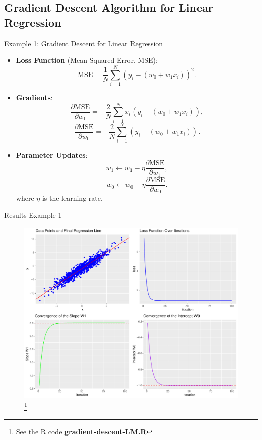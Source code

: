 \documentclass[10pt, hyperref={colorlinks = true,linkcolor = blue}]{beamer}
\begin{document}
{{}
{\subsection{Gradient Descent Algorithm for Linear Regression}
\begin{frame}{Example 1: Gradient Descent for Linear Regression}
 \begin{itemize}[<+->]
        \item \textbf{Loss Function} (Mean Squared Error, MSE):
        \[
        \text{MSE} = \frac{1}{N} \sum_{i=1}^{N} (y_i - (w_0 + w_1 x_i))^2.
        \]
        \item \textbf{Gradients}:
        \[
        \frac{\partial \text{MSE}}{\partial w_1} = -\frac{2}{N} \sum_{i=1}^{N} x_i (y_i - (w_0   + w_1 x_i)),
        \]
        \[
        \frac{\partial \text{MSE}}{\partial w_0} = -\frac{2}{N} \sum_{i=1}^{N} (y_i - (w_0+ w_1 x_i)).
        \]
        \item \textbf{Parameter Updates}:
        \[
        w_1 \leftarrow w_1 - \eta \frac{\partial \text{MSE}}{\partial w_1},
        \]
        \[
        w_0 \leftarrow w_0 - \eta \frac{\partial \text{MSE}}{\partial w_0}.
        \]
        where \( \eta \) is the learning rate.
    \end{itemize}
\end{frame}

\begin{frame}{Results Example 1}
\begin{figure}
\includegraphics[width=0.9\linewidth]{figures/gradient_descent_plots.pdf}\footnote{See the R code \textbf{gradient-descent-LM.R}}
\end{figure}
\end{frame} 

}}
\end{document}
